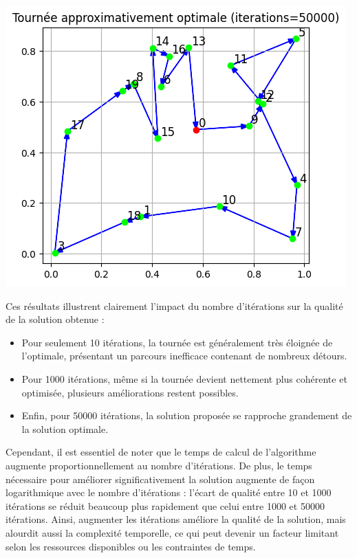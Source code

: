 \documentclass{article}
\begin{document}
\includegraphics[scale=0.5]{hm_tsp_50000_iter.png}
\vspace{0.3cm}

Ces résultats illustrent clairement l'impact du nombre d'itérations sur la qualité de la solution obtenue :
\begin{itemize}
    \item Pour seulement 10 itérations, la tournée est généralement très éloignée de l'optimale, présentant un parcours inefficace contenant de nombreux détours.
    \item Pour 1000 itérations, même si la tournée devient nettement plus cohérente et optimisée, plusieurs améliorations restent possibles.
    \item Enfin, pour 50000 itérations, la solution proposée se rapproche grandement de la solution optimale. \\
\end{itemize}

Cependant, il est essentiel de noter que le temps de calcul de l'algorithme augmente proportionnellement au nombre d'itérations.
De plus, le temps nécessaire pour améliorer significativement la solution augmente de façon logarithmique avec le nombre d'itérations : l'écart de qualité entre 10 et 1000 itérations se réduit beaucoup plus rapidement que celui entre 1000 et 50000 itérations.
Ainsi, augmenter les itérations améliore la qualité de la solution, mais alourdit aussi la complexité temporelle, ce qui peut devenir un facteur limitant selon les ressources disponibles ou les contraintes de temps.
\end{document}
